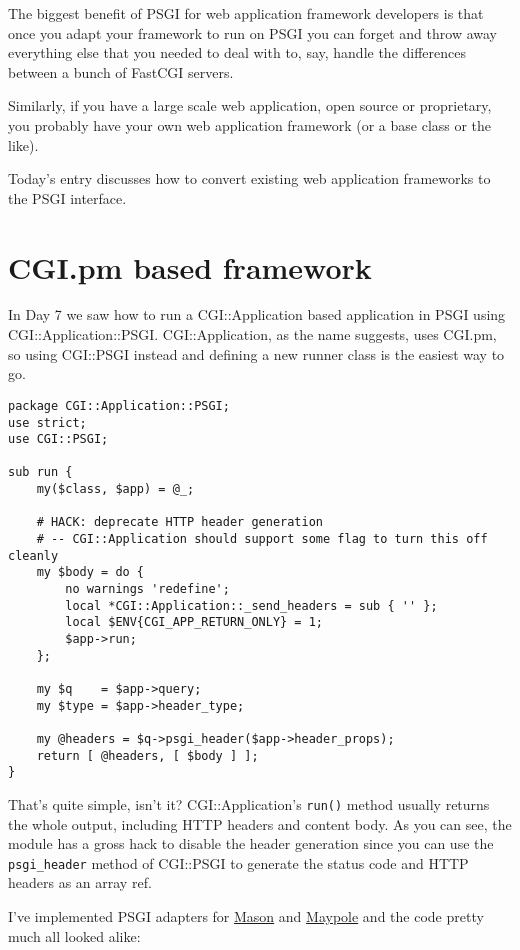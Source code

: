 The biggest benefit of PSGI for web application framework developers is
that once you adapt your framework to run on PSGI you can forget and
throw away everything else that you needed to deal with to, say, handle
the differences between a bunch of FastCGI servers.

Similarly, if you have a large scale web application, open source or
proprietary, you probably have your own web application framework (or a
base class or the like).

Today's entry discusses how to convert existing web application
frameworks to the PSGI interface.

\section{CGI.pm based framework}\label{cgi.pm-based-framework}

In Day 7 we saw how to run a CGI::Application based application in PSGI
using CGI::Application::PSGI. CGI::Application, as the name suggests,
uses CGI.pm, so using CGI::PSGI instead and defining a new runner class
is the easiest way to go.

\begin{lstlisting}
package CGI::Application::PSGI;
use strict;
use CGI::PSGI;

sub run {
    my($class, $app) = @_;

    # HACK: deprecate HTTP header generation
    # -- CGI::Application should support some flag to turn this off cleanly
    my $body = do {
        no warnings 'redefine';
        local *CGI::Application::_send_headers = sub { '' };
        local $ENV{CGI_APP_RETURN_ONLY} = 1;
        $app->run;
    };

    my $q    = $app->query;
    my $type = $app->header_type;

    my @headers = $q->psgi_header($app->header_props);
    return [ @headers, [ $body ] ];
}
\end{lstlisting}

That's quite simple, isn't it? CGI::Application's \lstinline!run()!
method usually returns the whole output, including HTTP headers and
content body. As you can see, the module has a gross hack to disable the
header generation since you can use the \lstinline!psgi_header! method
of CGI::PSGI to generate the status code and HTTP headers as an array
ref.

I've implemented PSGI adapters for
\href{http://search.cpan.org/perldoc?HTML::Mason}{Mason} and
\href{http://search.cpan.org/perldoc?Maypole}{Maypole} and the code
pretty much all looked alike:

